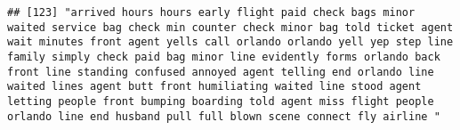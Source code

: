 \documentclass[
]{article}
\begin{document}
\begin{verbatim}
## [123] "arrived hours hours early flight paid check bags minor waited service bag check min counter check minor bag told ticket agent wait minutes front agent yells call orlando orlando yell yep step line family simply check paid bag minor line evidently forms orlando back front line standing confused annoyed agent telling end orlando line waited lines agent butt front humiliating waited line stood agent letting people front bumping boarding told agent miss flight people orlando line end husband pull full blown scene connect fly airline "                                                                                                                                                                                                                                                                                                                                                                                                                                                                                                                                                                                                                                                                                                                                                                                                                                                                                                                                                                                                                                                                                                                                                                                                                                       

\end{verbatim}
\end{document}
